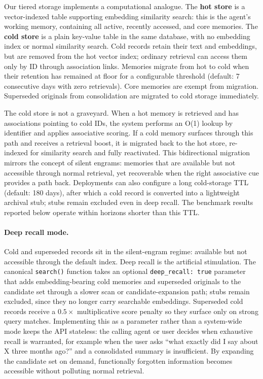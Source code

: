 \documentclass[11pt,a4paper]{article}
\begin{document}
Our tiered storage implements a computational analogue. The \textbf{hot store} is a vector-indexed table supporting embedding similarity search: this is the agent's working memory, containing all active, recently accessed, and core memories. The \textbf{cold store} is a plain key-value table in the same database, with no embedding index or normal similarity search. Cold records retain their text and embeddings, but are removed from the hot vector index; ordinary retrieval can access them only by ID through association links. Memories migrate from hot to cold when their retention has remained at floor for a configurable threshold (default: 7 consecutive days with zero retrievals). Core memories are exempt from migration. Superseded originals from consolidation are migrated to cold storage immediately.

The cold store is not a graveyard. When a hot memory is retrieved and has associations pointing to cold IDs, the system performs an O(1) lookup by identifier and applies associative scoring. If a cold memory surfaces through this path and receives a retrieval boost, it is migrated back to the hot store, re-indexed for similarity search and fully reactivated. This bidirectional migration mirrors the concept of silent engrams: memories that are available but not accessible through normal retrieval, yet recoverable when the right associative cue provides a path back. Deployments can also configure a long cold-storage TTL (default: 180 days), after which a cold record is converted into a lightweight archival stub; stubs remain excluded even in deep recall. The benchmark results reported below operate within horizons shorter than this TTL.

\paragraph{Deep recall mode.} Cold and superseded records sit in the silent-engram regime: available but not accessible through the default index. Deep recall is the artificial stimulation. The canonical \texttt{search()} function takes an optional \texttt{deep\_recall: true} parameter that adds embedding-bearing cold memories and superseded originals to the candidate set through a slower scan or candidate-expansion path; stubs remain excluded, since they no longer carry searchable embeddings. Superseded cold records receive a $0.5\times$ multiplicative score penalty so they surface only on strong query matches. Implementing this as a parameter rather than a system-wide mode keeps the API stateless: the calling agent or user decides when exhaustive recall is warranted, for example when the user asks ``what exactly did I say about X three months ago?'' and a consolidated summary is insufficient. By expanding the candidate set on demand, functionally forgotten information becomes accessible without polluting normal retrieval.
\end{document}
